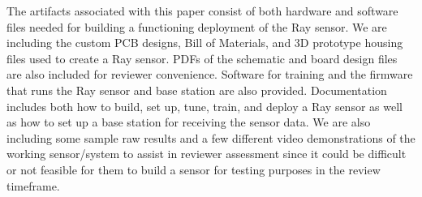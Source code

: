 The artifacts associated with this paper consist of both hardware and software files needed for building a functioning deployment of the Ray sensor.  We are including the custom PCB designs, Bill of Materials, and 3D prototype housing files used to create a Ray sensor. PDFs of the schematic and board design files are also included for reviewer convenience.  Software for training and the firmware that runs the Ray sensor and base station are also provided.  Documentation includes both how to build, set up, tune, train, and deploy a Ray sensor as well as how to set up a base station for receiving the sensor data.  We are also including some sample raw results and a few different video demonstrations of the working sensor/system to assist in reviewer assessment since it could be difficult or not feasible for them to build a sensor for testing purposes in the review timeframe.